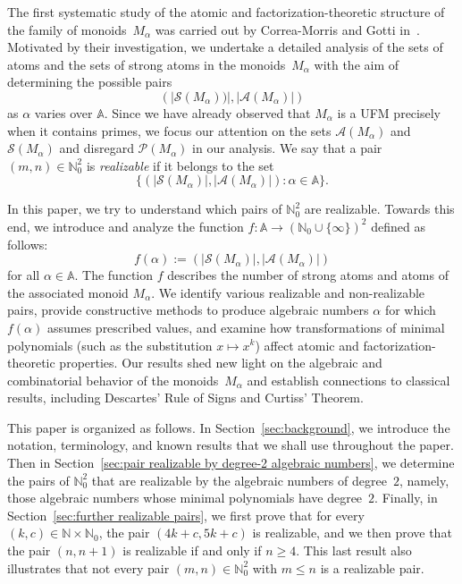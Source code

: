 \documentclass[11pt]{amsart}
\theoremstyle{definition}
\theoremstyle{remark}
\numberwithin{equation}{section}
\newcommand{\aaa}{\mathbb{A}}
\newcommand{\nn}{\mathbb{N}}
\begin{document}
\smallskip

The first systematic study of the atomic and factorization-theoretic structure of the family of monoids~$M_\alpha$ was carried out by Correa-Morris and Gotti in~\cite{CG22}. Motivated by their investigation, we undertake a detailed analysis of the sets of atoms and the sets of strong atoms in the monoids~$M_\alpha$ with the aim of determining the possible pairs
\[
    (|\mathcal{S}(M_\alpha))|, |\mathcal{A}(M_\alpha)|)
\]
as $\alpha$ varies over $\mathbb{A}$. Since we have already observed that $M_\alpha$ is a UFM precisely when it contains primes, we focus our attention on the sets $\mathcal{A}(M_\alpha)$ and $\mathcal{S}(M_\alpha)$ and disregard $\mathcal{P}(M_\alpha)$ in our analysis. We say that a pair $(m,n) \in \nn_0^2$ is \emph{realizable} if it belongs to the set
\[
     \big\{ (|\mathcal{S}(M_\alpha)|, |\mathcal{A}(M_\alpha)|) : \alpha \in \aaa \big\}.
\]

\smallskip

In this paper, we try to understand which pairs of $\nn_0^2$ are realizable. Towards this end, we introduce and analyze the function $f \colon \mathbb{A} \to (\mathbb{N}_0 \cup \{\infty\})^2$ defined as follows:
\[
    f(\alpha) := (|\mathcal{S}(M_\alpha)|, |\mathcal{A}(M_\alpha)|)
\]
for all $\alpha \in \aaa$. The function $f$ describes the number of strong atoms and atoms of the associated monoid $M_\alpha$. We identify various realizable and non-realizable pairs, provide constructive methods to produce algebraic numbers $\alpha$ for which $f(\alpha)$ assumes prescribed values, and examine how transformations of minimal polynomials (such as the substitution $x \mapsto x^k$) affect atomic and factorization-theoretic properties. Our results shed new light on the algebraic and combinatorial behavior of the monoids~$M_\alpha$ and establish connections to classical results, including Descartes' Rule of Signs and Curtiss' Theorem.

\smallskip

This paper is organized as follows. In Section~\ref{sec:background}, we introduce the notation, terminology, and known results that we shall use throughout the paper. Then in Section~\ref{sec:pair realizable by degree-2 algebraic numbers}, we determine the pairs of $\nn_0^2$ that are realizable by the algebraic numbers of degree~$2$, namely, those algebraic numbers whose minimal polynomials have degree~$2$. Finally, in Section~\ref{sec:further realizable pairs}, we first prove that for every $(k,c) \in \nn \times \nn_0$, the pair $(4k+c, 5k+c)$ is realizable, and we then prove that the pair $(n,n+1)$ is realizable if and only if $n \ge 4$. This last result also illustrates that not every pair $(m,n) \in \nn_0^2$ with $m \le n$ is a realizable pair.
\end{document}
